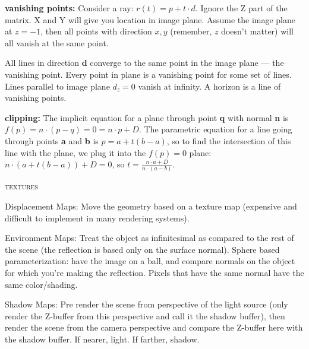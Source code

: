 \documentclass{article}
\begin{document}
{\bf vanishing points:} 
Consider a ray: $r(t)=p+t\cdot d$.
Ignore the Z part of the matrix. X and Y will give you location in image plane. Assume the image plane at $z=-1$, then all points with direction $x,y$ (remember, $z$ doesn't matter) will all vanish at the same point. 

All lines in direction {\bf d} converge to the same point in the image plane --- the vanishing point. Every point in plane is a vanishing point for some set of lines. Lines parallel to image plane $d_z=0$ vanish at infinity. A horizon is a line of vanishing points.

{\bf clipping:} The implicit equation for a plane through point {\bf q} with normal {\bf n} is $f(p)=n\cdot(p-q)=0 = n\cdot p + D$. The parametric equation for a line going through points {\bf a} and {\bf b} is $p=a+t(b-a)$, so to find the intersection of this line with the plane, we plug it into the $f(p)=0$ plane: $n\cdot(a+t(b-a))+D=0$, so $t=\frac{n\cdot a + D}{n\cdot(a-b)} $.
\begin{center}\textsc{textures}\end{center} 
Displacement Maps: Move the geometry based on a texture map (expensive and difficult to implement in many rendering systems).

Environment Maps: Treat the object as infinitesimal as compared to the rest of the scene (the reflection is based only on the surface normal). Sphere based parameterization: have the image on a ball, and compare normals on the object for which you're making the reflection. Pixels that have the same normal have the same color/shading.

Shadow Maps: Pre render the scene from perspective of the light source (only render the Z-buffer from this perspective and call it the shadow buffer), then render the scene from the camera perspective and compare the Z-buffer here with the shadow buffer. If nearer, light. If farther, shadow.
\end{document}
